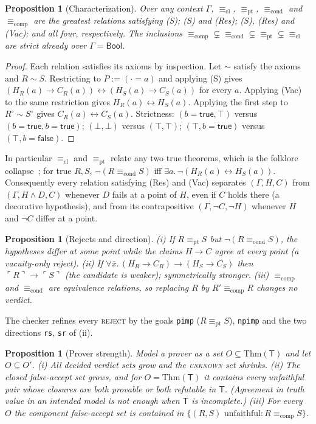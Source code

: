 \documentclass[10pt]{article}
\newtheorem{proposition}[theorem]{Proposition}
\theoremstyle{definition}
\newcommand{\T}{\mathsf{T}}
\newcommand{\Cl}[1]{\ulcorner #1 \urcorner}
\newcommand{\Ecl}{\mathrel{\equiv_{\mathrm{cl}}}}
\newcommand{\Econd}{\mathrel{\equiv_{\mathrm{cond}}}}
\newcommand{\Ecomp}{\mathrel{\equiv_{\mathrm{comp}}}}
\newcommand{\Epi}{\mathrel{\equiv_{\mathrm{pt}}}}
\newcommand{\V}[1]{\textsc{#1}}
\begin{document}
\begin{proposition}[Characterization]\label{thm:char}
Over any context $\Gamma$, $\Ecl$, $\Epi$, $\Econd$ and $\Ecomp$ are the greatest relations
satisfying (S); (S) and (Res); (S), (Res) and (Vac); and all four, respectively. The inclusions
$\Ecomp\subsetneq\Econd\subsetneq\Epi\subsetneq\Ecl$ are strict already over $\Gamma=\mathsf{Bool}$.
\end{proposition}
\begin{proof}
Each relation satisfies its axioms by inspection. Let $\sim$ satisfy the axioms and $R\sim S$.
Restricting to $P:=(\cdot=a)$ and applying (S) gives
$(H_R(a)\to C_R(a))\leftrightarrow(H_S(a)\to C_S(a))$ for every $a$. Applying (Vac) to the same
restriction gives $H_R(a)\leftrightarrow H_S(a)$. Applying the first step to $R^{\circ}\sim S^{\circ}$
gives $C_R(a)\leftrightarrow C_S(a)$. Strictness: $(b{=}\mathsf{true},\top)$ versus
$(b{=}\mathsf{true},b{=}\mathsf{true})$; $(\bot,\bot)$ versus $(\top,\top)$; $(\top,b{=}\mathsf{true})$
versus $(\top,b{=}\mathsf{false})$.
\end{proof}

In particular $\Ecl$ and $\Epi$ relate any two true theorems, which is the folklore
collapse~\cite{beq,tla}; for true $R,S$, $\neg(R\Econd S)$ iff
$\exists a.\,\neg(H_R(a)\leftrightarrow H_S(a))$. Consequently every relation satisfying (Res) and
(Vac) separates $(\Gamma,H,C)$ from $(\Gamma,H\wedge D,C)$ whenever $D$ fails at a point of $H$, even
if $C$ holds there (a decorative hypothesis), and from its contrapositive $(\Gamma,\neg C,\neg H)$
whenever $H$ and $\neg C$ differ at a point.

\begin{proposition}[Rejects and direction]\label{prop:vac}
(i) If $R\Epi S$ but $\neg(R\Econd S)$, the hypotheses differ at some point while the claims $H\to C$
agree at every point (a \emph{vacuity-only} reject). (ii) If
$\forall\bar x.\,(H_R\to C_R)\to(H_S\to C_S)$ then $\Cl R\to\Cl S$ (the candidate is \emph{weaker});
symmetrically \emph{stronger}. (iii) $\Ecomp$ and $\Econd$ are equivalence relations, so replacing
$R$ by $R'\Ecomp R$ changes no verdict.
\end{proposition}
The checker refines every \V{reject} by the goals \texttt{pimp} ($R\Epi S$), \texttt{npimp} and the
two directions \texttt{rs}, \texttt{sr} of (ii).

\begin{proposition}[Prover strength]\label{thm:mono}
Model a prover as a set $O\subseteq\mathrm{Thm}(\T)$ and let $O\subseteq O'$. (i) All decided verdict
sets grow and the \V{unknown} set shrinks. (ii) The closed false-accept set grows, and for
$O=\mathrm{Thm}(\T)$ it contains every unfaithful pair whose closures are both provable or both
refutable in $\T$. (Agreement in truth value in an intended model is not enough when $\T$ is
incomplete.)
(iii) For every $O$ the component false-accept set is contained in
$\{(R,S)\text{ unfaithful}: R\Ecomp S\}$.
\end{proposition}
\end{document}

